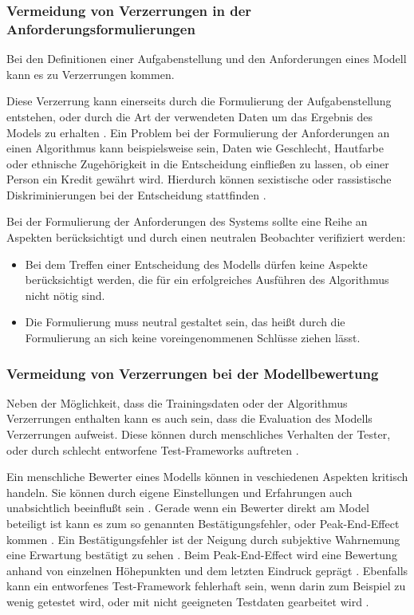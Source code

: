 \documentclass[12pt]{article}
\begin{document}
\subsubsection{Vermeidung von Verzerrungen in der Anforderungsformulierungen}
Bei den Definitionen einer Aufgabenstellung und den Anforderungen eines Modell kann es zu Verzerrungen kommen.

Diese Verzerrung kann einerseits durch die Formulierung der Aufgabenstellung entstehen, oder durch die Art der verwendeten Daten um das Ergebnis des Models zu erhalten \cite{Srinivasan}.
Ein Problem bei der Formulierung der Anforderungen an einen Algorithmus kann beispielsweise sein, Daten wie Geschlecht, Hautfarbe oder ethnische Zugehörigkeit in die 
Entscheidung einfließen zu lassen, ob einer Person ein Kredit gewährt wird. Hierdurch können sexistische oder rassistische Diskriminierungen bei der Entscheidung stattfinden \cite{Srinivasan}.

Bei der Formulierung der Anforderungen des Systems sollte eine Reihe an Aspekten berücksichtigt und durch einen neutralen Beobachter verifiziert werden:
\begin{itemize}
    \item Bei dem Treffen einer Entscheidung des Modells dürfen keine Aspekte berücksichtigt werden, die für ein erfolgreiches Ausführen des Algorithmus nicht nötig sind.
    \item Die Formulierung muss neutral gestaltet sein, das heißt durch die Formulierung an sich keine voreingenommenen Schlüsse ziehen lässt.
\end{itemize}

\subsubsection{Vermeidung von Verzerrungen bei der Modellbewertung}
Neben der Möglichkeit, dass die Trainingsdaten oder der Algorithmus Verzerrungen enthalten kann es auch sein, dass die Evaluation des Modells Verzerrungen aufweist.
Diese können durch menschliches Verhalten der Tester, oder durch schlecht entworfene Test-Frameworks auftreten \cite{Srinivasan}.

Ein menschliche Bewerter eines Modells können in veschiedenen Aspekten kritisch handeln. Sie können durch eigene Einstellungen und Erfahrungen auch unabsichtlich beeinflußt sein \cite{Srinivasan}.
Gerade wenn ein Bewerter direkt am Model beteiligt ist kann es zum so genannten Bestätigungsfehler, oder \glqq Peak-End-Effect\grqq{} kommen \cite{Srinivasan}.
Ein Bestätigungsfehler ist der Neigung durch subjektive Wahrnemung eine Erwartung bestätigt zu sehen \cite{Srinivasan}. 
Beim \glqq Peak-End-Effect\grqq{} wird eine Bewertung anhand von einzelnen Höhepunkten und dem letzten Eindruck geprägt \cite{Srinivasan}.
Ebenfalls kann ein entworfenes Test-Framework fehlerhaft sein, wenn darin zum Beispiel zu wenig getestet wird, oder mit nicht geeigneten Testdaten gearbeitet wird \cite{Srinivasan}.
\end{document}
